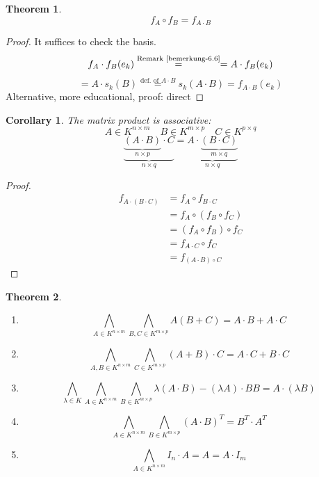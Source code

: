 \documentclass[a4paper,landscape,twocolumn]{article}
\newtheorem{theorem}{Theorem}
\newtheorem{cor}{Corollary}
\begin{document}
\begin{theorem}
  \label{satz-6.8}
  \[ f_A \circ f_B = f_{A \cdot B} \]
\end{theorem}
\begin{proof}
  It suffices to check the basis.
  \[
    f_A \cdot f_B(e_k) \overset{\text{Remark~\ref{bemerkung-6.6}}}{=}
    = A \cdot f_B(e_k)
  \] \[
    = A \cdot s_k(B) \overset{\text{def. of } A \cdot B}{=} s_k(A \cdot B) = f_{A \cdot B}(e_k)
  \]
  Alternative, more educational, proof: direct
\end{proof}
\begin{cor}
  The matrix product is associative:
  \[ A \in K^{n\times m} \quad B \in K^{m\times p} \quad C \in K^{p\times q} \]
  \[
    \underbrace{\underbrace{(A \cdot B)}_{n\times p} \cdot C}_{n\times q}
    = \underbrace{A \cdot \underbrace{(B \cdot C)}_{m\times q}}_{n\times q}
  \]
\end{cor}
\begin{proof}
  \begin{align*}
      f_{A \cdot (B \cdot C)}
        &= f_A \circ f_{B \cdot C} \\
        &= f_A \circ (f_B \circ f_C) \\
        &= (f_A \circ f_B) \circ f_C \\
        &= f_{A \cdot C} \circ f_C \\
        &= f_{(A\cdot B) \circ C}
  \end{align*}
\end{proof}
\begin{theorem}
  \label{satz-6.10}
  \begin{enumerate}
    \item \[ \bigwedge_{A \in K^{n\times m}} \bigwedge_{B,C \in K^{m\times p}} A(B + C) = A \cdot B + A \cdot C \]
    \item \[ \bigwedge_{A,B \in K^{n\times m}} \bigwedge_{C \in K^{m\times p}} (A + B) \cdot C = A \cdot C + B \cdot C \]
    \item \[ \bigwedge_{\lambda \in K} \bigwedge_{A \in K^{n\times m}} \bigwedge_{B \in K^{m\times p}} \lambda (A \cdot B) - (\lambda A)\cdot B B = A \cdot (\lambda B) \]
    \item \[ \bigwedge_{A \in K^{n\times m}} \bigwedge_{B \in K^{m\times p}} (A \cdot B)^T = B^T \cdot A^T \]
    \item \[ \bigwedge_{A \in K^{n\times m}} I_n \cdot A = A = A \cdot I_m \]
  \end{enumerate}
\end{theorem}
\end{document}
